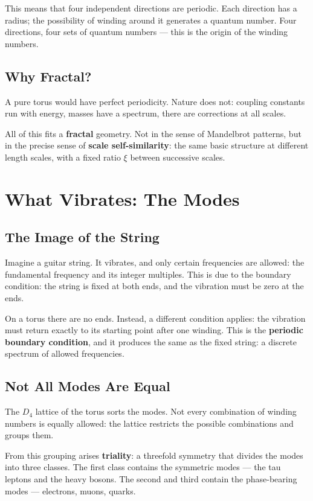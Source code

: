 \documentclass[12pt,oneside]{book}
\begin{document}
This means that four independent directions are periodic. Each direction has a radius; the possibility of winding around it generates a quantum number. Four directions, four sets of quantum numbers --- this is the origin of the winding numbers.

\section{Why Fractal?}

A pure torus would have perfect periodicity. Nature does not: coupling constants run with energy, masses have a spectrum, there are corrections at all scales.

All of this fits a \textbf{fractal} geometry. Not in the sense of Mandelbrot patterns, but in the precise sense of \textbf{scale self-simi\-larity}: the same basic structure at different length scales, with a fixed ratio $\xi$ between successive scales.

\chapter{What Vibrates: The Modes}

\section{The Image of the String}

Imagine a guitar string. It vibrates, and only certain frequencies are allowed: the fundamental frequency and its integer multiples. This is due to the boundary condition: the string is fixed at both ends, and the vibration must be zero at the ends.

On a torus there are no ends. Instead, a different condition applies: the vibration must return exactly to its starting point after one winding. This is the \textbf{periodic boundary condition}, and it produces the same as the fixed string: a discrete spectrum of allowed frequencies.

\section{Not All Modes Are Equal}

The $D_4$ lattice of the torus sorts the modes. Not every combination of winding numbers is equally allowed: the lattice restricts the possible combinations and groups them.

From this grouping arises \textbf{triality}: a threefold symmetry that divides the modes into three classes. The first class contains the symmetric modes --- the tau leptons and the heavy bosons. The second and third contain the phase-bearing modes --- electrons, muons, quarks.
\end{document}
